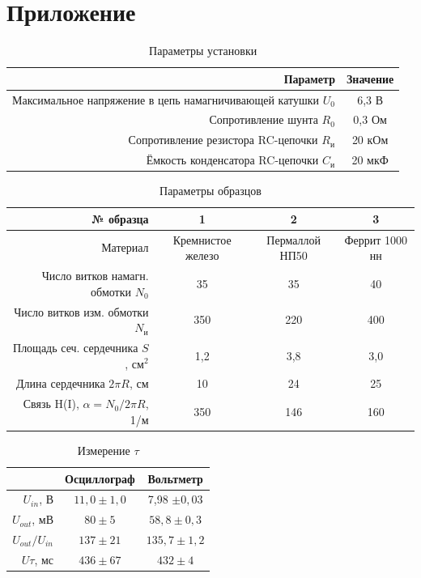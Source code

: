 \documentclass[12pt]{extarticle}
\begin{document}
\newpage
\section{Приложение}

	\begin{table}[h!]
		\caption{Параметры установки}
		\centering
		\begin{tabular}{|r|c|}
			\hline
			Параметр & Значение \\
			\hline
			Максимальное напряжение в цепь намагничивающей катушки $U_0$ & 6,3 В  \\
			Сопротивление шунта $R_0$ & 0,3 Ом  \\
			Сопротивление резистора RC-цепочки $R_{\text{и}}$ &  20 кОм \\
			Ёмкость конденсатора RC-цепочки $C_{\text{и}}$  & 20 мкФ \\
			\hline
		\end{tabular}
	\end{table}

	\begin{table}[h!]
		\caption{Параметры образцов}
		\centering
		\begin{tabular}{|r||c|c|c|}
		\hline
		№ образца & 1 & 2 & 3 \\
		\hline
		Материал & Кремнистое железо & Пермаллой НП50 & Феррит 1000 нн\\
		\hline
		Число витков намагн. обмотки $N_0$ & 35 & 35 & 40 \\
		\hline
		Число витков изм. обмотки $N_{\text{и}}$ & 350 & 220  & 400 \\
		\hline
		Площадь сеч. сердечника $S$, см$^2$ & 1,2 & 3,8 & 3,0 \\
		\hline
		Длина сердечника $2\pi R$, см & 10 & 24 & 25 \\
		\hline
		Связь H(I), $\alpha = N_0 / 2\pi R$, 1/м & 350 & 146 & 160 \\
		\hline
	\end{tabular}
		
	\end{table}
	
	\begin{table}[h!]
		\caption{Измерение $\tau$}
		\centering
		\begin{tabular}{|r||c|c|}
			\hline
			 & Осциллограф & Вольтметр  \\
			\hline
			$U_{in}$, В & $11,0 \pm 1,0$ & 7,98 $\pm 0,03$ \\
			\hline
			$U_{out}$, мВ & $80 \pm 5$ & $58,8 \pm 0,3$   \\
			\hline
			$U_{out}/U_{in}$& $137 \pm 21$ & $135,7 \pm 1,2$   \\
			\hline
			$U\tau$, мс & $436 \pm 67 $ & $432 \pm 4$   \\
			\hline
		\end{tabular}
		
	\end{table}
\end{document}
